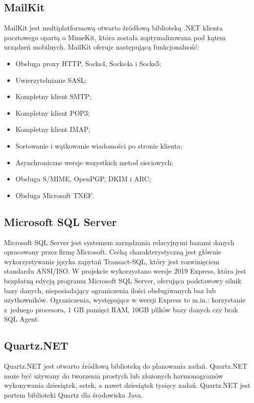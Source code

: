 \documentclass[12pt,a4paper]{article}
\begin{document}
		\subsection{MailKit}
			\indent MailKit jest multiplatformową otwarto źródłową biblioteką .NET klienta pocztowego opartą o MimeKit, która została zoptymalizowana pod kątem urządzeń mobilnych.
			MailKit oferuje następującą funkcjonalność:
			\begin{itemize}
				\item Obsługa proxy HTTP, Socks4, Socks4a i Socks5;
				\item Uwierzytelnianie SASL;
				\item Kompletny klient SMTP;
				\item Kompletny klient POP3;
				\item Kompletny klient IMAP;
				\item Sortowanie i wątkowanie wiadomości po stronie klienta;
				\item Asynchroniczne wersje wszystkich metod sieciowych;
				\item Obsługa S/MIME, OpenPGP, DKIM i ARC;
				\item Obsługa Microsoft TNEF.
			\end{itemize}

		\subsection{Microsoft SQL Server}		 
		 	\indent Microsoft SQL Server jest systemem zarządzania relacyjnymi bazami danych opracowany przez firmę Microsoft. Cechą charakterystyczną jest głównie wykorzystywanie języka
		 	zapytań	Transact-SQL, który jest rozwinięciem standardu ANSI/ISO. W projekcie wykorzystano wersje 2019 Express, która jest bezpłatną edycją programu Microsoft SQL Server, oferująca
		 	podstawowy silnik bazy danych, nieposiadający ograniczenia ilości obsługiwanych baz lub użytkowników. Ograniczenia, występujące w wersji Express to  m.in.:
		 	korzystanie z~jednego procesora, 1 GB pamięci RAM, 10GB plików bazy danych czy brak SQL Agent.
		
		\subsection{Quartz.NET}
			\indent Quartz.NET jest otwarto źródłową biblioteką do planowania zadań.
			Quartz.NET może być używany do tworzenia prostych lub złożonych harmonogramów wykonywania
			dziesiątek, setek, a nawet dziesiątek tysięcy zadań.
			Quartz.NET jest portem biblioteki Quartz dla środowiska Java. 	 
\end{document}
